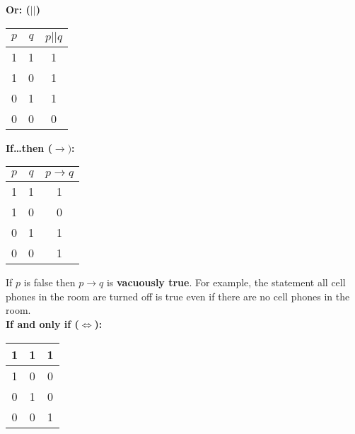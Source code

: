         \noindent \textbf{Or: ($\vert\vert$)} \\

        \begin{center}
            \begin{tabular} {|c|c|c|}
                \hline
                $p$ & $q$ & $p||q$ \\
                \hline
                1   & 1   & 1      \\
                \hline
                1   & 0   & 1      \\
                \hline
                0   & 1   & 1      \\
                \hline
                0   & 0   & 0      \\
                \hline
            \end{tabular}
        \end{center}

        \noindent\textbf{If\dots then ($\rightarrow)$:} \\

        \begin{center}
            \begin{tabular} {|c|c|c|}
                \hline
                $p$ & $q$ & $p\rightarrow q$ \\
                \hline
                1   & 1   & 1                \\
                \hline
                1   & 0   & 0                \\
                \hline
                0   & 1   & 1                \\
                \hline
                0   & 0   & 1                \\
                \hline
            \end{tabular}
        \end{center}

        \noindent If $p$ is false then $p\rightarrow q$ is \textbf{vacuously true}.
        For example, the statement all cell phones in the room are turned off is true even
        if there are no cell phones in the room. \\

        \noindent \textbf{If and only if ($\iff$):} \\

        \begin{center}
            \begin{tabular} {|c|c|c|}
                \hline
                1 & 1 & 1 \\
                \hline
                1 & 0 & 0 \\
                \hline
                0 & 1 & 0 \\
                \hline
                0 & 0 & 1 \\
                \hline
            \end{tabular}
        \end{center}

